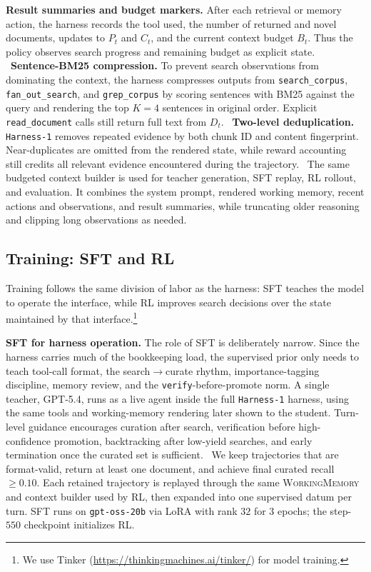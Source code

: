 \documentclass{article}
\newcommand{\sys}{\texttt{Harness-1}\xspace}
\newcommand{\wm}{\textsc{WorkingMemory}\xspace}
\newcommand{\verify}{\texttt{verify}\xspace}
\begin{document}
\textbf{Result summaries and budget markers.}
After each retrieval or memory action, the harness records the tool used, the
number of returned and novel documents, updates to $P_t$ and $C_t$, and the
current context budget $B_t$. Thus the policy observes search progress and
remaining budget as explicit state.
\
\textbf{Sentence-BM25 compression.}
To prevent search observations from dominating the context, the harness
compresses outputs from \texttt{search\_corpus}, \texttt{fan\_out\_search}, and
\texttt{grep\_corpus} by scoring sentences with BM25 against the query and
rendering the top $K{=}4$ sentences in original order. Explicit
\texttt{read\_document} calls still return full text from $D_t$.
\
\textbf{Two-level deduplication.}
\sys removes repeated evidence by both chunk ID and content fingerprint.
Near-duplicates are omitted from the rendered state, while reward accounting
still credits all relevant evidence encountered during the trajectory.
\
The same budgeted context builder is used for teacher generation, SFT replay,
RL rollout, and evaluation. It combines the system prompt, rendered working
memory, recent actions and observations, and result summaries, while truncating
older reasoning and clipping long observations as needed.

\subsection{Training: SFT and RL}
\label{sec:training}

Training follows the same division of labor as the harness: SFT teaches the
model to operate the interface, while RL improves search decisions over the
state maintained by that interface.\footnote{We use Tinker
(\url{https://thinkingmachines.ai/tinker/}) for model training.}

\textbf{SFT for harness operation.}
The role of SFT is deliberately narrow. Since the harness carries much of the
bookkeeping load, the supervised prior only needs to teach tool-call format,
the search$\to$curate rhythm, importance-tagging discipline, memory review, and
the \verify-before-promote norm. A single teacher, GPT-5.4, runs as a live agent
inside the full \sys harness, using the same tools and working-memory rendering
later shown to the student. Turn-level guidance encourages curation after
search, verification before high-confidence promotion, backtracking after
low-yield searches, and early termination once the curated set is sufficient.
\
We keep trajectories that are format-valid, return at least one document, and
achieve final curated recall $\geq 0.10$. Each retained trajectory is replayed
through the same \wm and context builder used by RL, then expanded into one
supervised datum per turn. SFT runs on \texttt{gpt-oss-20b} via LoRA
with rank $32$ for $3$ epochs; the step-$550$ checkpoint initializes RL.
\end{document}
